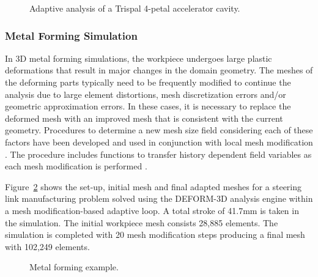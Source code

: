 \begin{figure}
\begin{center}
\caption{Adaptive analysis of a Trispal 4-petal accelerator cavity.}
\label{fig:trispalAdapt}
\end{center}
\end{figure}

\subsubsection{Metal Forming Simulation}

In 3D metal forming simulations, the workpiece undergoes large plastic
deformations that result in major changes in the domain geometry. The
meshes of the deforming parts typically need to be frequently modified
to continue the analysis due to large element distortions, mesh
discretization errors and/or geometric approximation errors. In these
cases, it is necessary to replace the deformed mesh with an improved
mesh that is consistent with the current geometry.  Procedures to
determine a new mesh size field considering each of these factors have
been developed and used in conjunction with local mesh modification
\cite{WaKo04}. The procedure includes functions to transfer history
dependent field variables as each mesh modification is performed
\cite{WaKo04}.

Figure~\ref{fig:forming} shows the set-up, initial mesh and final
adapted meshes for a steering link manufacturing problem solved using
the DEFORM-3D analysis engine \cite{Fl04} within a mesh
modification-based adaptive loop. A total stroke of 41.7mm is taken in
the simulation. The initial workpiece mesh consists 28,885
elements. The simulation is completed with 20 mesh modification steps
producing a final mesh with 102,249 elements.


\begin{figure}
\begin{center}
\caption{Metal forming example.}
\label{fig:forming}
\end{center}
\end{figure}


